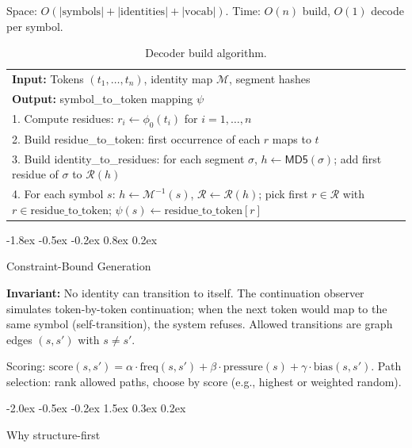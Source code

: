 \documentclass[10pt]{article}
\makeatletter
\renewcommand{\section}{\@startsection{section}{1}{\z@}%
  {-2.0ex \@plus -0.5ex \@minus -0.2ex}%
  {1.5ex \@plus 0.3ex \@minus 0.2ex}%
  {\large\bfseries\raggedright}}
\renewcommand{\subsection}{\@startsection{subsection}{2}{\z@}%
  {-1.8ex \@plus -0.5ex \@minus -0.2ex}%
  {0.8ex \@plus 0.2ex}%
  {\normalsize\bfseries\raggedright}}
\makeatother
\begin{document}
Space: $O(|\text{symbols}| + |\text{identities}| + |\text{vocab}|)$. Time: $O(n)$ build, $O(1)$ decode per symbol.

\begin{table}[t]
\centering
\caption{Decoder build algorithm.}
\label{tab:decoder}
\begin{tabular}{l}
\toprule
\textbf{Input:} Tokens $(t_1, \ldots, t_n)$, identity map $\mathcal{M}$, segment hashes\\
\textbf{Output:} symbol\_to\_token mapping $\psi$\\
\midrule
1. Compute residues: $r_i \gets \phi_0(t_i)$ for $i = 1, \ldots, n$\\
2. Build residue\_to\_token: first occurrence of each $r$ maps to $t$\\
3. Build identity\_to\_residues: for each segment $\sigma$, $h \gets \mathsf{MD5}(\sigma)$; add first residue of $\sigma$ to $\mathcal{R}(h)$\\
4. For each symbol $s$: $h \gets \mathcal{M}^{-1}(s)$, $\mathcal{R} \gets \mathcal{R}(h)$; pick first $r \in \mathcal{R}$ with $r \in \text{residue\_to\_token}$; $\psi(s) \gets \text{residue\_to\_token}[r]$\\
\bottomrule
\end{tabular}
\end{table}

\subsection{Constraint-Bound Generation}

\textbf{Invariant:} No identity can transition to itself. The continuation observer simulates token-by-token continuation; when the next token would map to the same symbol (self-transition), the system refuses. Allowed transitions are graph edges $(s, s')$ with $s \neq s'$.

Scoring: $\text{score}(s, s') = \alpha \cdot \text{freq}(s, s') + \beta \cdot \text{pressure}(s) + \gamma \cdot \text{bias}(s, s')$. Path selection: rank allowed paths, choose by score (e.g., highest or weighted random).

\section{Why structure-first}
\label{sec:why}
\end{document}
